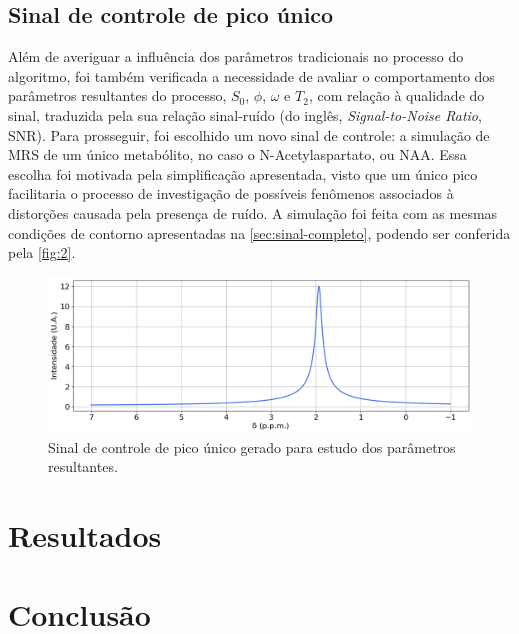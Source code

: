 \documentclass[12pt]{article}
\begin{document}
\subsection{Sinal de controle de pico único}

Além de averiguar a influência dos parâmetros tradicionais no processo do algoritmo, foi também verificada a necessidade de avaliar o 
comportamento dos parâmetros resultantes do processo, $S_0$, $\phi$, $\omega$ e $T_2$, com relação à qualidade do sinal, traduzida pela
sua relação sinal-ruído (do inglês, \textit{Signal-to-Noise Ratio}, SNR). Para prosseguir, foi escolhido um novo sinal de controle: a 
simulação de MRS de um único metabólito, no caso o N-Acetylaspartato, ou NAA. Essa escolha foi motivada pela simplificação apresentada, 
visto que um único pico facilitaria o processo de investigação de possíveis fenômenos associados à distorções causada pela presença de 
ruído. A simulação foi feita com as mesmas condições de contorno apresentadas na \autoref{sec:sinal-completo}, podendo ser conferida pela
\autoref{fig:2}.

\begin{figure} [H]
    \includegraphics[scale=0.5]{sinal-unico-pico.png}
    \centering
    \caption{Sinal de controle de pico único gerado para estudo dos parâmetros resultantes.}
    \label{fig:2}
\end{figure}

\section{Resultados}

\section{Conclusão}






\end{document}
